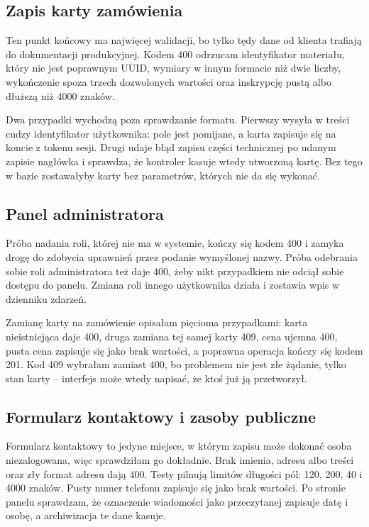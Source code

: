 \subsection{Zapis karty zamówienia}
\label{ssec:karty-zamowien}

Ten punkt końcowy ma najwięcej walidacji, bo tylko tędy dane od klienta trafiają do dokumentacji produkcyjnej. Kodem 400 odrzucam identyfikator materiału, który nie jest poprawnym UUID, wymiary w innym formacie niż dwie liczby, wykończenie spoza trzech dozwolonych wartości oraz inskrypcję pustą albo dłuższą niż 4000 znaków.

Dwa przypadki wychodzą poza sprawdzanie formatu. Pierwszy wysyła w treści cudzy identyfikator użytkownika: pole jest pomijane, a karta zapisuje się na koncie z tokenu sesji. Drugi udaje błąd zapisu części technicznej po udanym zapisie nagłówka i sprawdza, że kontroler kasuje wtedy utworzoną kartę. Bez tego w bazie zostawałyby karty bez parametrów, których nie da się wykonać.

\subsection{Panel administratora}
\label{ssec:operacje-administracyjne}

Próba nadania roli, której nie ma w systemie, kończy się kodem 400 i zamyka drogę do zdobycia uprawnień przez podanie wymyślonej nazwy. Próba odebrania sobie roli administratora też daje 400, żeby nikt przypadkiem nie odciął sobie dostępu do panelu. Zmiana roli innego użytkownika działa i zostawia wpis w dzienniku zdarzeń.

Zamianę karty na zamówienie opisałam pięcioma przypadkami: karta nieistniejąca daje 400, druga zamiana tej samej karty 409, cena ujemna 400, pusta cena zapisuje się jako brak wartości, a poprawna operacja kończy się kodem 201. Kod 409 wybrałam zamiast 400, bo problemem nie jest złe żądanie, tylko stan karty -- interfejs może wtedy napisać, że ktoś już ją przetworzył.

\subsection{Formularz kontaktowy i zasoby publiczne}
\label{ssec:formularz-origin}

Formularz kontaktowy to jedyne miejsce, w którym zapisu może dokonać osoba niezalogowana, więc sprawdziłam go dokładnie. Brak imienia, adresu albo treści oraz zły format adresu dają 400. Testy pilnują limitów długości pól: 120, 200, 40 i 4000 znaków. Pusty numer telefonu zapisuje się jako brak wartości. Po stronie panelu sprawdzam, że oznaczenie wiadomości jako przeczytanej zapisuje datę i osobę, a archiwizacja te dane kasuje.


